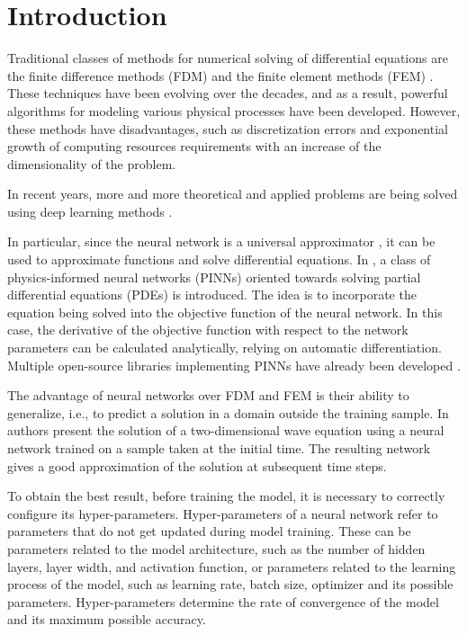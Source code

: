 \documentclass[reprint,
superscriptaddress,
amsmath,amssymb,aps,showkeys,showpacs,
twoside,final,secnumarabic,%
nofootinbib]{revtex4-2}
\begin{document}
\section{Introduction}
Traditional classes of methods for numerical solving of differential equations are the finite difference methods (FDM) and the finite element methods (FEM) \cite{bib01}. These techniques have been evolving over the decades, and as a result, powerful algorithms for modeling various physical processes have been developed. However, these methods have disadvantages, such as discretization errors and exponential growth of computing resources requirements with an increase of the dimensionality of the problem.

In recent years, more and more theoretical and applied problems are being solved using deep learning methods \cite{bib02,bib03,bib04,bib05}.

In particular, since the neural network is a universal approximator \cite{bib06}, it can be used to approximate functions and solve differential equations. In \cite{bib07}, a class of physics-informed neural networks (PINNs) oriented towards solving partial differential equations (PDEs) is introduced. The idea is to incorporate the equation being solved into the objective function of the neural network. In this case, the derivative of the objective function with respect to the network parameters can be calculated analytically, relying on automatic differentiation. Multiple open-source libraries implementing PINNs have already been developed \cite{bib08}.

The advantage of neural networks over FDM and FEM is their ability to generalize, i.e., to predict a solution in a domain outside the training sample. In \cite{bib09} authors present the solution of a two-dimensional wave equation using a neural network trained on a sample taken at the initial time. The resulting network gives a good approximation of the solution at subsequent time steps.

To obtain the best result, before training the model, it is necessary to correctly configure its hyper-parameters. Hyper-parameters of a neural network refer to parameters that do not get updated during model training. These can be parameters related to the model architecture, such as the number of hidden layers, layer width, and activation function, or parameters related to the learning process of the model, such as learning rate, batch size, optimizer and its possible parameters. Hyper-parameters determine the rate of convergence of the model and its maximum possible accuracy.
\end{document}
